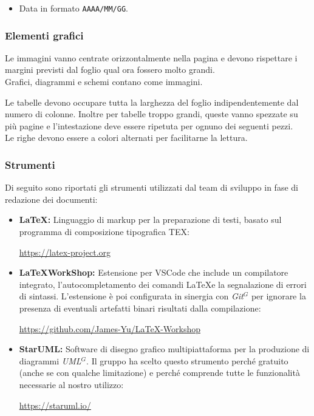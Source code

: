     \begin{itemize}
    \item Data in formato \texttt{AAAA/MM/GG}. %
    \end{itemize}

\subsubsection{Elementi grafici}

    Le immagini vanno centrate orizzontalmente nella pagina e devono rispettare i margini previsti dal foglio qual ora
    fossero molto grandi.\\
    Grafici, diagrammi e schemi contano come immagini.

    Le tabelle devono occupare tutta la larghezza del foglio indipendentemente dal numero di colonne.
    Inoltre per tabelle troppo grandi, queste vanno spezzate su più pagine e l'intestazione deve essere ripetuta
    per ognuno dei seguenti pezzi.\\
    Le righe devono essere a colori alternati per facilitarne la lettura.

\subsubsection{Strumenti}

Di seguito sono riportati gli strumenti utilizzati dal team di sviluppo in fase di redazione dei documenti:

\begin{itemize}
  \item \textbf{\LaTeX:} Linguaggio di markup per la preparazione di testi, basato sul programma di composizione tipografica TEX:
    \begin{center}
      \url{https://latex-project.org}
    \end{center}
  \item \textbf{\LaTeX WorkShop:} Estensione per VSCode che include un compilatore integrato, l'autocompletamento dei comandi \LaTeX e la segnalazione di errori di sintassi. L'estensione è poi configurata in sinergia con \emph{Git}$^{G}$ per ignorare la presenza di eventuali artefatti binari risultati dalla compilazione:
  \begin{center}
    \url{https://github.com/James-Yu/LaTeX-Workshop}
  \end{center}
  \item \textbf{StarUML:} Software di disegno grafico multipiattaforma per la produzione di diagrammi \emph{UML}$^{G}$. Il gruppo ha scelto questo strumento perché gratuito (anche se con qualche limitazione) e perché comprende tutte le funzionalità necessarie al nostro utilizzo:
  \begin{center}
    \url{https://staruml.io/}
  \end{center}
\end{itemize}



